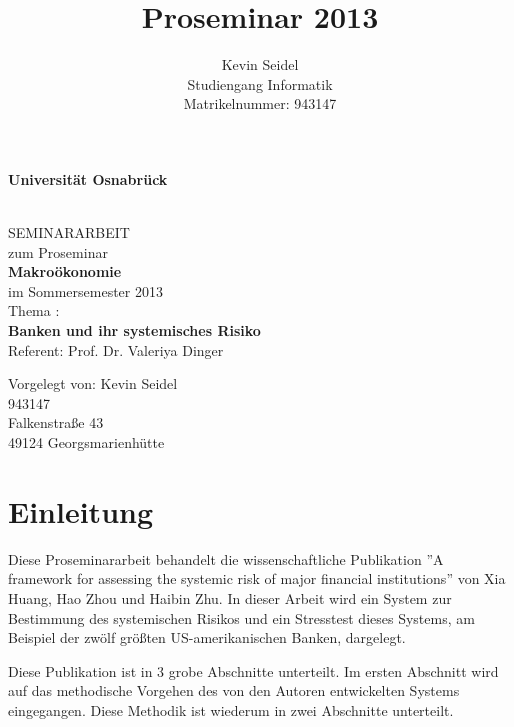 \documentclass[a4paper,12pt]{scrartcl}
\title{Proseminar 2013}
\author{Kevin Seidel \\ Studiengang Informatik \\ Matrikelnummer: 943147}
\begin{document}
\begin{titlepage}
\begin{center}
\vspace*{1.5cm}
\begin{Large}
\textbf{Universität Osnabrück} \\[1cm]
\end{Large}

\noindent\hrulefill
\\[1.5cm]
SEMINARARBEIT \\[1cm]
zum Proseminar \\[1cm]
\textbf{Makroökonomie} \\[1cm]
im Sommersemester 2013 \\[1.5cm]
Thema : \\[1cm]
\textbf{Banken und ihr systemisches Risiko} \\[1cm]
Referent: Prof. Dr. Valeriya Dinger \\[2cm]

\end{center}
\begin{flushleft}
Vorgelegt von: \hfill Kevin Seidel \\
\hfill 943147 \\
\hfill Falkenstraße 43 \\
\hfill 49124 Georgsmarienhütte
\end{flushleft}

\end{titlepage}

\newpage

\setcounter{page}{2}
\tableofcontents



\newpage
{} 
\setcounter{page}{1} 


\section{Einleitung}
Diese Proseminararbeit behandelt die wissenschaftliche Publikation ''A framework for assessing the systemic risk of major financial institutions'' von Xia Huang, Hao Zhou und Haibin Zhu. In dieser Arbeit wird ein System zur Bestimmung des systemischen Risikos und ein Stresstest dieses Systems, am Beispiel der zwölf größten US-amerikanischen Banken, dargelegt.

Diese Publikation ist in 3 grobe Abschnitte unterteilt. Im ersten Abschnitt wird auf das methodische Vorgehen des von den Autoren entwickelten Systems eingegangen. Diese Methodik ist wiederum in zwei Abschnitte unterteilt.
\end{document}
